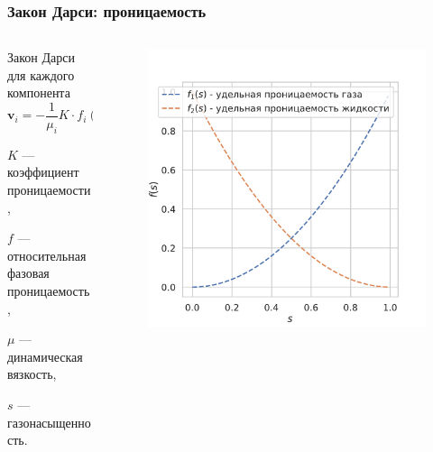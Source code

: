 \begin{frame}
    \frametitle{Закон Дарси: проницаемость}
    \begin{columns}
    \begin{column}{0.6\textwidth}
        \begin{block}{Закон Дарси для каждого компонента}
            \begin{equation}
                \mathbf{v}_i = -\frac{1}{\mu_i} K \cdot f_i (s)
                \cdot \nabla P
            \end{equation}
        \end{block}
        \(K\) --- коэффициент проницаемости,

        \(f\) --- относительная фазовая проницаемость,

        \(\mu\) --- динамическая вязкость,

        \(s\) --- газонасыщенность.
    \end{column}
    \begin{column}{0.4\textwidth}
        \begin{figure}[H]
            \centering
            \includegraphics[width=\textwidth]{img/two-phase.pdf}
            \label{fig:}
        \end{figure}
    \end{column}
    \end{columns}
\end{frame}
